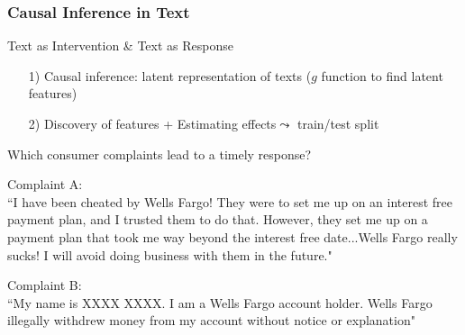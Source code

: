 \documentclass[xcolor=dvipsnames]{beamer}
\begin{document}
\begin{frame}
\frametitle{Causal Inference in Text}

\Large
Text as Intervention \& Text as Response

\begin{itemize}
\item[1)] Causal inference: latent representation of texts ($g$ function to find latent features)
\item[2)] Discovery of features + Estimating effects$\leadsto$ train/test split
\end{itemize}




\end{frame}

\begin{frame}

\huge

Which consumer complaints lead to a timely response?

\end{frame}



\begin{frame}

Complaint A:\\
``I have been cheated by Wells Fargo! They were to set me up on an interest free payment plan, and I trusted them to do that. However, they set me up on a payment plan that took me way beyond the interest free date...Wells Fargo really sucks! I will avoid doing business with them in the future."

\vspace{0.25in}

Complaint B: \\
``My name is XXXX XXXX. I am a Wells Fargo account holder. Wells Fargo illegally withdrew money from my account without notice or explanation"

\pause
\vspace{0.125in}
\Large
{}



\end{frame}
\end{document}
